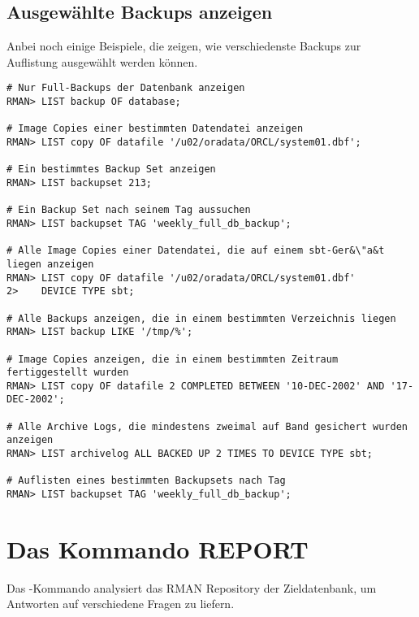       \subsection{Ausgew\"ahlte Backups anzeigen}
        Anbei noch einige Beispiele, die zeigen, wie verschiedenste Backups zur Auflistung ausgew\"ahlt werden k\"onnen.
        \begin{lstlisting}[caption={Auflistungen eingrenzen},label=admin1352,language=rman]
# Nur Full-Backups der Datenbank anzeigen
RMAN> LIST backup OF database;

# Image Copies einer bestimmten Datendatei anzeigen
RMAN> LIST copy OF datafile '/u02/oradata/ORCL/system01.dbf';

# Ein bestimmtes Backup Set anzeigen
RMAN> LIST backupset 213;

# Ein Backup Set nach seinem Tag aussuchen
RMAN> LIST backupset TAG 'weekly_full_db_backup';

# Alle Image Copies einer Datendatei, die auf einem sbt-Ger&\"a&t liegen anzeigen
RMAN> LIST copy OF datafile '/u02/oradata/ORCL/system01.dbf'
2>    DEVICE TYPE sbt;

# Alle Backups anzeigen, die in einem bestimmten Verzeichnis liegen
RMAN> LIST backup LIKE '/tmp/%';

# Image Copies anzeigen, die in einem bestimmten Zeitraum fertiggestellt wurden
RMAN> LIST copy OF datafile 2 COMPLETED BETWEEN '10-DEC-2002' AND '17-DEC-2002';

# Alle Archive Logs, die mindestens zweimal auf Band gesichert wurden anzeigen
RMAN> LIST archivelog ALL BACKED UP 2 TIMES TO DEVICE TYPE sbt;

# Auflisten eines bestimmten Backupsets nach Tag
RMAN> LIST backupset TAG 'weekly_full_db_backup';
          \end{lstlisting}
    \section{Das Kommando REPORT}
      Das -Kommando analysiert das RMAN Repository der Zieldatenbank, um Antworten auf verschiedene Fragen zu liefern.
